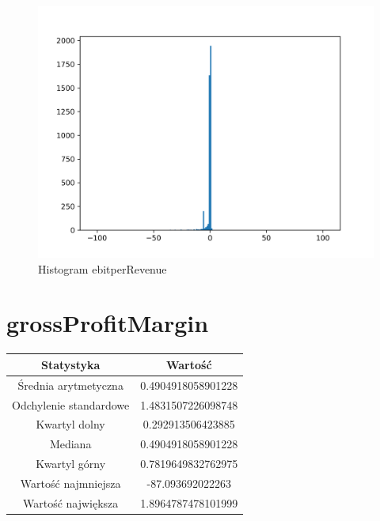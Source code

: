 \documentclass{article}
\begin{document}
\begin{figure}[h!]
    \includegraphics[width=\linewidth]{variables/ebitperRevenue.png}
    \caption{Histogram ebitperRevenue }
\end{figure}\section{ grossProfitMargin }

\begin{center}
    \begin{tabular}{|c | c|} 
    \hline
    Statystyka & Wartość \\
    \hline\hline
    Średnia arytmetyczna & 0.4904918058901228 \\ 
    \hline
    Odchylenie standardowe & 1.4831507226098748 \\
    \hline
    Kwartyl dolny & 0.292913506423885 \\
    \hline
    Mediana & 0.4904918058901228 \\
    \hline
    Kwartyl górny & 0.7819649832762975 \\
    \hline
    Wartość najmniejsza & -87.093692022263 \\
    \hline
    Wartość największa & 1.8964787478101999 \\
    \hline
   \end{tabular}
\end{center}
\end{document}
